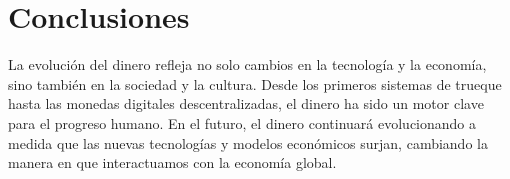 \section{Conclusiones}

La evolución del dinero refleja no solo cambios en la tecnología y la economía, sino también en la sociedad y la cultura. Desde los primeros sistemas de trueque hasta las monedas digitales descentralizadas, el dinero ha sido un motor clave para el progreso humano. En el futuro, el dinero continuará evolucionando a medida que las nuevas tecnologías y modelos económicos surjan, cambiando la manera en que interactuamos con la economía global.

